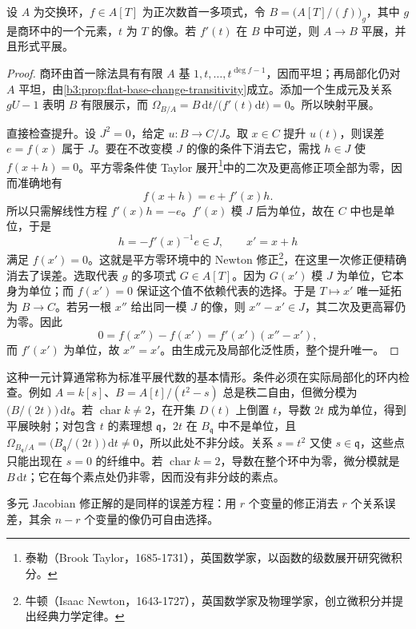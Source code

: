 \begin{proposition}\label{b3:prop:standard-etale-lift}
	设 \(A\) 为交换环，\(f\in A[T]\) 为正次数首一多项式，令 \(B=\bigl(A[T]/(f)\bigr)_g\)，其中 \(g\) 是商环中的一个元素，\(t\) 为 \(T\) 的像。若 \(f'(t)\) 在 \(B\) 中可逆，则 \(A\to B\) 平展，并且形式平展。
\end{proposition}
\begin{proof}
	商环由首一除法具有有限 \(A\) 基 \(1,t,\ldots,t^{\deg f-1}\)，因而平坦；再局部化仍对 \(A\) 平坦，由\cref{b3:prop:flat-base-change-transitivity}成立。添加一个生成元及关系 \(gU-1\) 表明 \(B\) 有限展示，而 \(\Omega_{B/A}=B\,\mathrm{d}t/\bigl(f'(t)\mathrm{d}t\bigr)=0\)。所以映射平展。

	直接检查提升。设 \(J^2=0\)，给定 \(u:B\to C/J\)。取 \(x\in C\) 提升 \(u(t)\)，则误差 \(e=f(x)\) 属于 \(J\)。要在不改变模 \(J\) 的像的条件下消去它，需找 \(h\in J\) 使 \(f(x+h)=0\)。平方零条件使 Taylor 展开\footnote{泰勒（Brook Taylor，1685-1731），英国数学家，以函数的级数展开研究微积分。}中的二次及更高修正项全部为零，因而准确地有
	\[
		f(x+h)=e+f'(x)h.
	\]
	所以只需解线性方程 \(f'(x)h=-e\)。\(f'(x)\) 模 \(J\) 后为单位，故在 \(C\) 中也是单位，于是
	\[
		h=-f'(x)^{-1}e\in J,\qquad x'=x+h
	\]
	满足 \(f(x')=0\)。这就是平方零环境中的 Newton 修正\footnote{牛顿（Isaac Newton，1643-1727），英国数学家及物理学家，创立微积分并提出经典力学定律。}，在这里一次修正便精确消去了误差。选取代表 \(g\) 的多项式 \(G\in A[T]\)。因为 \(G(x')\) 模 \(J\) 为单位，它本身为单位；而 \(f(x')=0\) 保证这个值不依赖代表的选择。于是 \(T\mapsto x'\) 唯一延拓为 \(B\to C\)。若另一根 \(x''\) 给出同一模 \(J\) 的像，则 \(x''-x'\in J\)，其二次及更高幂仍为零。因此
	\[
		0=f(x'')-f(x')=f'(x')(x''-x'),
	\]
	而 \(f'(x')\) 为单位，故 \(x''=x'\)。由生成元及局部化泛性质，整个提升唯一。
\end{proof}

这种一元计算通常称为标准平展代数的基本情形。条件必须在实际局部化的环内检查。例如 \(A=k[s]\)、\(B=A[t]/(t^2-s)\) 总是秩二自由，但微分模为 \(\bigl(B/(2t)\bigr)\,\mathrm{d}t\)。若 \(\operatorname{char}k\ne2\)，在开集 \(D(t)\) 上倒置 \(t\)，导数 \(2t\) 成为单位，得到平展映射；对包含 \(t\) 的素理想 \(\mathfrak q\)，\(2t\) 在 \(B_{\mathfrak q}\) 中不是单位，且 \(\Omega_{B_{\mathfrak q}/A}=\bigl(B_{\mathfrak q}/(2t)\bigr)\,\mathrm{d}t\ne0\)，所以此处不非分歧。关系 \(s=t^2\) 又使 \(s\in\mathfrak q\)，这些点只能出现在 \(s=0\) 的纤维中。若 \(\operatorname{char}k=2\)，导数在整个环中为零，微分模就是 \(B\,\mathrm{d}t\)；它在每个素点处仍非零，因而没有非分歧的素点。

多元 Jacobian 修正解的是同样的误差方程：用 \(r\) 个变量的修正消去 \(r\) 个关系误差，其余 \(n-r\) 个变量的像仍可自由选择。

